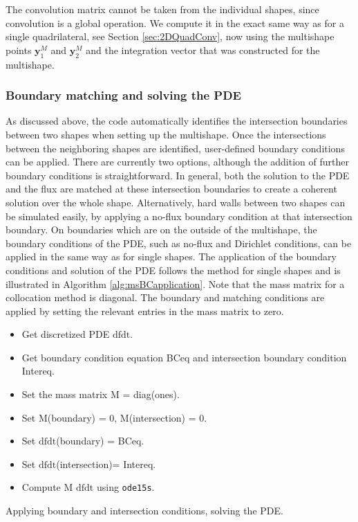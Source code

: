 The convolution matrix cannot be taken from the individual shapes, since convolution is a global operation. We compute it in the exact same way as for a single quadrilateral, see Section \ref{sec:2DQuadConv}, now using the multishape points $\mathbf{y}_1^M$ and $\mathbf{y}_2^M$ and the integration vector that was constructed for the multishape.



\subsubsection{Boundary matching and solving the PDE}
As discussed above, the code automatically identifies the intersection boundaries between two shapes when setting up the multishape. Once the intersections between the neighboring shapes are identified, user-defined boundary conditions can be applied. There are currently two options, although the addition of further boundary conditions is straightforward. In general, both the solution to the PDE and the flux are matched at these intersection boundaries to create a coherent solution over the whole shape. Alternatively, hard walls between two shapes can be simulated easily, by applying a no-flux boundary condition at that intersection boundary. On boundaries which are on the outside of the multishape, the boundary conditions of the PDE, such as no-flux and Dirichlet conditions, can be applied in the same way as for single shapes.
The application of the boundary conditions and solution of the PDE follows the method for single shapes and is illustrated in Algorithm \ref{alg:msBCapplication}. Note that the mass matrix for a collocation method is diagonal. The boundary and matching conditions are applied by setting the relevant entries in the mass matrix to zero.
\\
\begin{algorithm}[H]
	\SetAlgoLined
	\begin{itemize}
		\item Get discretized PDE $\text{dfdt}$.
		\item Get boundary condition equation BCeq and intersection boundary condition Intereq.
		\item Set the mass matrix M = diag(ones).
		\item Set M(boundary) = 0,  M(intersection) = 0.
		\item Set $\text{dfdt}$(boundary) = BCeq.
		\item Set $\text{dfdt}$(intersection)= Intereq.
		\item Compute M $\text{dfdt}$ using \texttt{ode15s}.
	\end{itemize}
	
	\caption{Applying boundary and intersection conditions, solving the PDE.}
	\label{alg:msBCapplication}
\end{algorithm}

